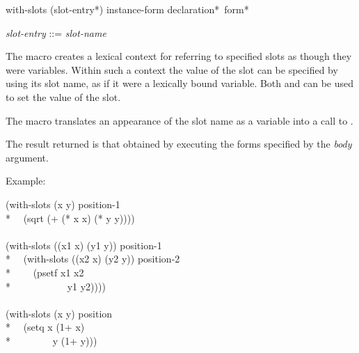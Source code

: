 \begin{defmac}
with-slots ({slot-entry}*) instance-form {declaration}* {\,form}*

\begin{tabbing}
{\it slot-entry\/} ::= {\it slot-name\/} {\Mor} 
\end{tabbing}
The macro  creates a lexical context for referring to
specified slots as though they were variables.  Within such a context
the value of the slot can be specified by using its slot name, as if
it were a lexically bound variable.  Both  and 
can be used to set the value of the slot.

The macro  translates an appearance of the slot name as
a variable into a call to .

  



The result returned is that obtained by executing the forms specified
by the {\it body\/} argument.

Example:

\begin{lisp}
(with-slots (x y) position-1 \\*
~~(sqrt (+ (* x x) (* y y)))) \\
\\
(with-slots ((x1 x) (y1 y)) position-1 \\*
~~(with-slots ((x2 x) (y2 y)) position-2 \\*
~~~~(psetf x1 x2 \\*
~~~~~~~~~~~y1 y2)))) \\
\\
(with-slots (x y) position \\*
~~(setq x (1+ x) \\*
~~~~~~~~y (1+ y)))
\end{lisp}



\end{defmac}
